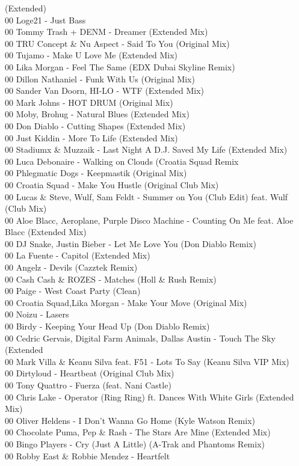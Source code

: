 \begin{multicols}{2}
(Extended)\\ 00 Loge21 - Just Bass\\ 00 Tommy Trash + DENM - Dreamer (Extended Mix)\\ 00 TRU Concept \& Nu Aspect -  Said To You (Original Mix)\\ 00 Tujamo - Make U Love Me (Extended Mix)\\ 00 Lika Morgan - Feel The Same (EDX Dubai Skyline Remix)\\ 00 Dillon Nathaniel - Funk With Us (Original Mix)\\ 00 Sander Van Doorn, HI-LO - WTF (Extended Mix)\\ 00 Mark Johns - HOT DRUM (Original Mix)\\ 00 Moby, Brohug - Natural Blues (Extended Mix)\\ 00 Don Diablo - Cutting Shapes (Extended Mix)\\ 00 Just Kiddin - More To Life (Extended Mix)\\ 00 Stadiumx \& Muzzaik  -  Last Night A D.J. Saved My Life (Extended Mix)\\ 00 Luca Debonaire - Walking on Clouds (Croatia Squad Remix\\ 00 Phlegmatic Dogs - Keepmastik (Original Mix)\\ 00 Croatia Squad - Make You Hustle (Original Club Mix)\\ 00 Lucas \& Steve, Wulf, Sam Feldt - Summer on You (Club Edit) feat. Wulf (Club Mix)\\ 00 Aloe Blacc, Aeroplane, Purple Disco Machine - Counting On Me feat. Aloe Blacc (Extended Mix)\\ 00 DJ Snake, Justin Bieber - Let Me Love You (Don Diablo Remix)\\ 00 La Fuente - Capitol (Extended Mix)\\ 00 Angelz - Devils (Cazztek Remix)\\ 00 Cash Cash \& ROZES - Matches (Holl \& Rush Remix)\\ 00 Paige - West Coast Party (Clean)\\ 00 Croatia Squad,Lika Morgan - Make Your Move (Original Mix)\\ 00 Noizu - Lasers\\ 00 Birdy - Keeping Your Head Up (Don Diablo Remix)\\ 00 Cedric Gervais, Digital Farm Animals, Dallas Austin - Touch The Sky (Extended\\ 00 Mark Villa \& Keanu Silva feat. F51 - Lots To Say (Keanu Silva VIP Mix)\\ 00 Dirtyloud - Heartbeat (Original Club Mix)\\ 00 Tony Quattro - Fuerza (feat. Nani Castle)\\ 00 Chris Lake - Operator (Ring Ring) ft. Dances With White Girls (Extended Mix)\\ 00 Oliver Heldens - I Don't Wanna Go Home (Kyle Watson Remix)\\ 00 Chocolate Puma, Pep \& Rash - The Stars Are Mine (Extended Mix)\\ 00 Bingo Players - Cry (Just A Little) (A-Trak and Phantoms Remix)\\ 00 Robby East \& Robbie Mendez - Heartfelt 
\end{multicols}
